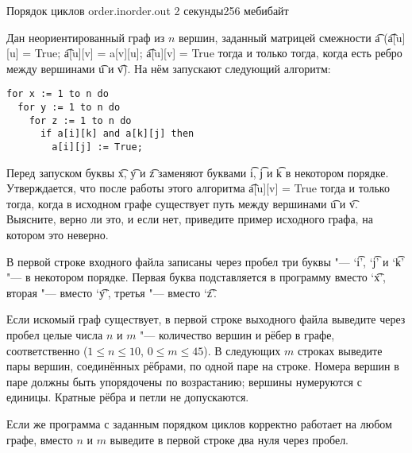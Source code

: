 \begin{problem}{Порядок циклов}
{order.in}{order.out}
{2 секунды}{256 мебибайт}{}

Дан неориентированный граф из $n$ вершин, заданный матрицей смежности
\t{a} (\t{a[u][u] = True}; \t{a[u][v] = a[v][u]}; \t{a[u][v] = True}
тогда и только тогда, когда есть ребро между вершинами \t{u} и \t{v}).
На нём запускают следующий алгоритм:
\begin{verbatim}
for x := 1 to n do
  for y := 1 to n do
    for z := 1 to n do
      if a[i][k] and a[k][j] then
        a[i][j] := True;
\end{verbatim}
Перед запуском буквы \t{x}, \t{y} и \t{z} заменяют буквами
\t{i}, \t{j} и \t{k} в некотором порядке. Утверждается, что после работы
этого алгоритма \t{a[u][v] = True} тогда и только тогда, когда в исходном
графе существует путь между вершинами \t{u} и \t{v}. Выясните, верно ли это,
и если нет, приведите пример исходного графа, на котором это неверно.

\InputFile

В первой строке входного файла записаны через пробел три буквы "---
`\t{i}', `\t{j}' и `\t{k}' "--- в некотором порядке. Первая буква
подставляется в программу вместо `\t{x}', вторая "--- вместо `\t{y}',
третья "--- вместо `\t{z}'.

\OutputFile

Если искомый граф существует, в первой строке выходного файла выведите
через пробел целые числа $n$ и $m$ "--- количество вершин и рёбер в графе,
соответственно ($1 \le n \le 10$, $0 \le m \le 45$).
В следующих $m$ строках выведите пары вершин, соединённых рёбрами, по одной
паре на строке. Номера вершин в паре должны быть упорядочены по возрастанию;
вершины нумеруются с единицы. Кратные рёбра и петли не допускаются.

Если же программа с заданным порядком циклов корректно работает на любом
графе, вместо $n$ и $m$ выведите в первой строке два нуля через пробел.

\Example

\begin{example}
%
\end{example}

\end{problem}
